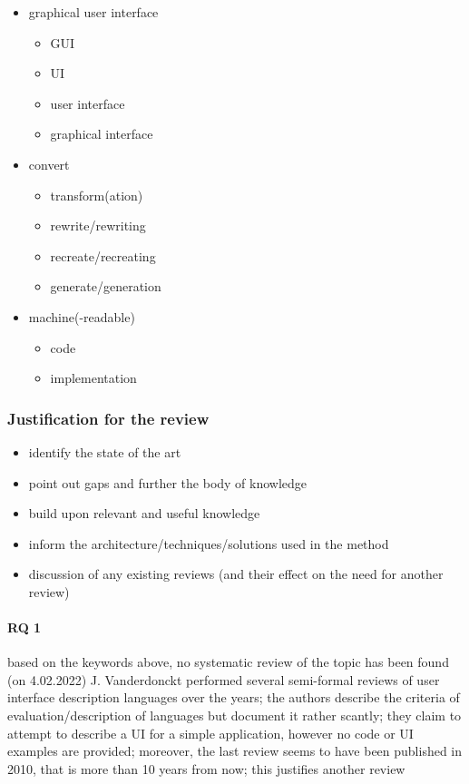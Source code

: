 \begin{itemize}
    \item graphical user interface 
    \begin{itemize}
        \item GUI
        \item UI
        \item user interface
        \item graphical interface
    \end{itemize}
    \item convert
    \begin{itemize}
        \item transform(ation)
        \item rewrite/rewriting
        \item recreate/recreating
        \item generate/generation
    \end{itemize}
    \item machine(-readable)
    \begin{itemize}
        \item code
        \item implementation
    \end{itemize}
\end{itemize}

\subsubsection[Justification]{Justification for the review}
\begin{itemize}
    \item identify the state of the art
    \item point out gaps and further the body of knowledge
    \item build upon relevant and useful knowledge
    \item inform the architecture/techniques/solutions used in the method
    \item discussion of any existing reviews (and their effect on the need for another review)
\end{itemize}

\paragraph{RQ 1}
based on the keywords above, no systematic review of the topic has been found (on 4.02.2022)
J. Vanderdonckt  performed several semi-formal reviews of
user interface description languages over the years;
the authors describe the criteria of evaluation/description of languages but document it rather scantly;
they claim to attempt to describe a UI for a simple application, however no code or UI examples are provided;
moreover, the last review seems to have been published in 2010, that is more than 10 years from now;
this justifies another review

